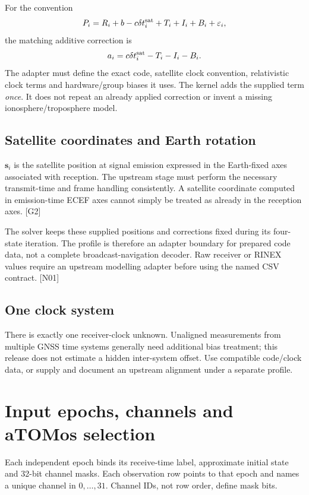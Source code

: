 \documentclass[11pt,a4paper]{article}
\newcommand{\ext}[1]{\textcolor{muted}{[#1]}}
\newcommand{\dec}[1]{\textcolor{accent}{[N#1]}}
\begin{document}
For the convention
\begin{equation}
P_i=R_i+b-c\delta t_i^{\rm sat}+T_i+I_i+B_i+\varepsilon_i,
\end{equation}
the matching additive correction is
\begin{equation}
a_i=c\delta t_i^{\rm sat}-T_i-I_i-B_i.
\end{equation}
The adapter must define the exact code, satellite clock convention, relativistic
clock terms and hardware/group biases it uses. The kernel adds the supplied term
\emph{once}. It does not repeat an already applied correction or invent a missing
ionosphere/troposphere model.

\subsection{Satellite coordinates and Earth rotation}
$\boldsymbol s_i$ is the satellite position at signal emission expressed in the
Earth-fixed axes associated with reception. The upstream stage must perform the
necessary transmit-time and frame handling consistently. A satellite coordinate
computed in emission-time ECEF axes cannot simply be treated as already in the
reception axes. \ext{G2}

The solver keeps these supplied positions and corrections fixed during its four-state
iteration. The profile is therefore an adapter boundary for prepared code data,
not a complete broadcast-navigation decoder. Raw receiver or RINEX values require
an upstream modelling adapter before using the named CSV contract. \dec{01}

\subsection{One clock system}
There is exactly one receiver-clock unknown. Unaligned measurements from multiple
GNSS time systems generally need additional bias treatment; this release does not
estimate a hidden inter-system offset. Use compatible code/clock data, or supply
and document an upstream alignment under a separate profile.
\clearpage

\section{Input epochs, channels and aTOMos selection}
Each independent epoch binds its receive-time label, approximate initial state and
32-bit channel masks. Each observation row points to that epoch and names a unique
channel in $0,\ldots,31$. Channel IDs, not row order, define mask bits.
\end{document}
